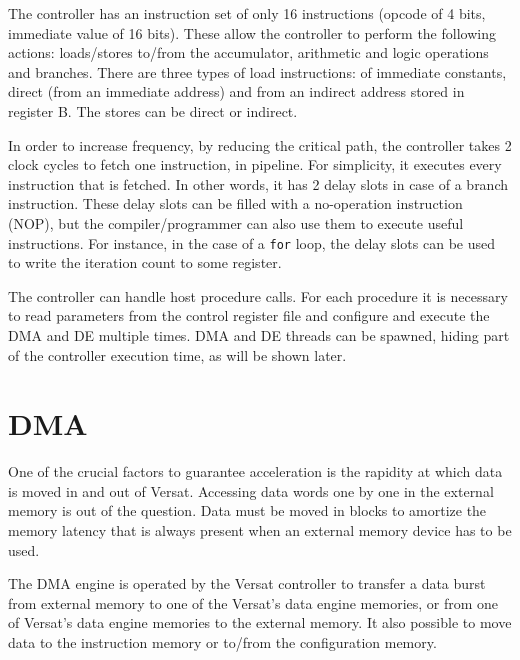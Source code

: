 The controller has an instruction set of only 16 instructions (opcode
of 4 bits, immediate value of 16 bits). These allow the controller to
perform the following actions: loads/stores to/from the accumulator,
arithmetic and logic operations and branches. There are three types of
load instructions: of immediate constants, direct (from an immediate
address) and from an indirect address stored in register B. The stores
can be direct or indirect.

In order to increase frequency, by reducing the critical path, the
controller takes 2 clock cycles to fetch one instruction, in
pipeline. For simplicity, it executes every instruction that is
fetched. In other words, it has 2 delay slots in case of a branch
instruction. These delay slots can be filled with a no-operation
instruction (NOP), but the compiler/programmer can also use them to
execute useful instructions. For instance, in the case of a {\tt for}
loop, the delay slots can be used to write the iteration count to some
register.

The controller can handle host procedure calls. For each procedure it
is necessary to read parameters from the control register file and
configure and execute the DMA and DE multiple times. DMA and DE
threads can be spawned, hiding part of the controller execution time,
as will be shown later.


\section{DMA}
\label{section:dma}

One of the crucial factors to guarantee acceleration is the rapidity
at which data is moved in and out of Versat. Accessing data words one
by one in the external memory is out of the question. Data must be
moved in blocks to amortize the memory latency that is always present
when an external memory device has to be used.

The DMA engine is operated by the Versat controller to transfer a data
burst from external memory to one of the Versat's data engine
memories, or from one of Versat's data engine memories to the external
memory. It also possible to move data to the instruction memory or
to/from the configuration memory.

